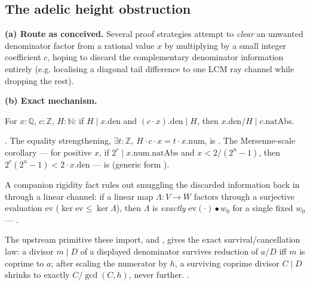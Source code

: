 \subsection{The adelic height obstruction}
\label{sec:adelic-height}

\textbf{(a) Route as conceived.} Several proof strategies attempt to
\emph{clear} an unwanted denominator factor from a rational value \(x\) by
multiplying by a small integer coefficient \(c\), hoping to discard the
complementary denominator information entirely (e.g. localising a diagonal
tail difference to one LCM ray channel while dropping the rest).

\textbf{(b) Exact mechanism.}
\begin{lem}
For \(x:\mathbb Q\), \(c:\mathbb Z\), \(H:\mathbb N\): if \(H\mid x.\mathrm{den}\)
and \((c\cdot x).\mathrm{den}\mid H\), then \(x.\mathrm{den}/H \mid
c.\mathrm{natAbs}\).
\end{lem}
. The equality
strengthening, \(\exists t:\mathbb Z,\ H\cdot c\cdot x = t\cdot x.\mathrm{num}\), is
. The
Mersenne-scale corollary — for positive \(x\), if \(2^r\mid x.\mathrm{num.natAbs}\)
and \(x<2/(2^n-1)\), then \(2^r(2^n-1)<2\cdot x.\mathrm{den}\) — is
 (generic form
).

A companion rigidity fact
rules out smuggling the discarded information back in through a linear
channel: if a linear map \(\Lambda:V\to W\) factors through a surjective
evaluation \(\mathrm{ev}\) (\(\ker\mathrm{ev}\le\ker\Lambda\)), then
\(\Lambda\) is \emph{exactly} \(\mathrm{ev}(\cdot)\bullet w_0\) for a single
fixed \(w_0\) —
.

The upstream
primitive these import,
 and
, gives the exact
survival/cancellation law: a divisor \(m\mid D\) of a displayed denominator
survives reduction of \(a/D\) iff \(m\) is coprime to \(a\); after scaling the
numerator by \(h\), a surviving coprime divisor \(C\mid D\) shrinks to
exactly \(C/\gcd(C,h)\), never further.  
.

